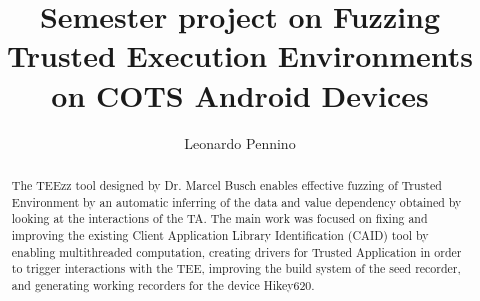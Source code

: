\documentclass[a4paper,11pt,oneside]{article}
\title{Semester project on Fuzzing Trusted Execution Environments on COTS Android Devices}
\author{Leonardo Pennino}
\newcommand{\sysname}{TEEzz\xspace}
\begin{document}
\maketitle
\makeacks

\begin{abstract}
  The \sysname \cite{TEEzz} tool designed by Dr. Marcel Busch enables effective fuzzing of
Trusted Environment by an automatic inferring of the data and value dependency
obtained by looking at the interactions of the TA.
The main work was focused on fixing
and improving the existing Client Application Library Identification (CAID)
tool by enabling multithreaded computation, creating drivers for Trusted
Application in order to trigger interactions with the TEE, improving the build system of the seed recorder, and generating working recorders
for the device Hikey620.
\end{abstract}


\maketoc
\end{document}

